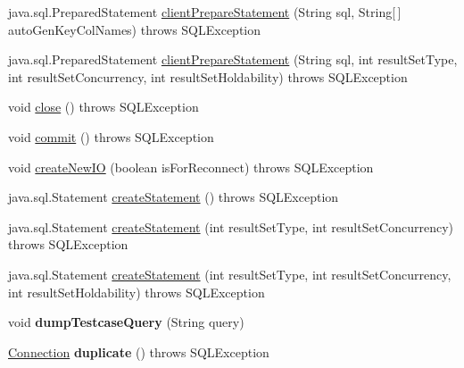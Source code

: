 \begin{DoxyCompactItemize}
\item 
java.\+sql.\+Prepared\+Statement \mbox{\hyperlink{classcom_1_1mysql_1_1jdbc_1_1_connection_impl_a9fcf3d739e8b60bdc9666e938ecd75ab}{client\+Prepare\+Statement}} (String sql, String\mbox{[}$\,$\mbox{]} auto\+Gen\+Key\+Col\+Names)  throws S\+Q\+L\+Exception 
\item 
java.\+sql.\+Prepared\+Statement \mbox{\hyperlink{classcom_1_1mysql_1_1jdbc_1_1_connection_impl_ab4f506b0ae8623a91e4aea7f33bb2da5}{client\+Prepare\+Statement}} (String sql, int result\+Set\+Type, int result\+Set\+Concurrency, int result\+Set\+Holdability)  throws S\+Q\+L\+Exception 
\item 
void \mbox{\hyperlink{classcom_1_1mysql_1_1jdbc_1_1_connection_impl_a9499cd266206c66001685b386c6a6b43}{close}} ()  throws S\+Q\+L\+Exception 
\item 
void \mbox{\hyperlink{classcom_1_1mysql_1_1jdbc_1_1_connection_impl_aa2c8c829d30458f22f7785396eb18af1}{commit}} ()  throws S\+Q\+L\+Exception 
\item 
void \mbox{\hyperlink{classcom_1_1mysql_1_1jdbc_1_1_connection_impl_ade9022e02eb0afed7976e6bc0f0b86da}{create\+New\+IO}} (boolean is\+For\+Reconnect)  throws S\+Q\+L\+Exception 
\item 
java.\+sql.\+Statement \mbox{\hyperlink{classcom_1_1mysql_1_1jdbc_1_1_connection_impl_af371aac6b857e26e7f92d486c52e3994}{create\+Statement}} ()  throws S\+Q\+L\+Exception 
\item 
java.\+sql.\+Statement \mbox{\hyperlink{classcom_1_1mysql_1_1jdbc_1_1_connection_impl_a17157765e71edeb5534901236da52fa3}{create\+Statement}} (int result\+Set\+Type, int result\+Set\+Concurrency)  throws S\+Q\+L\+Exception 
\item 
java.\+sql.\+Statement \mbox{\hyperlink{classcom_1_1mysql_1_1jdbc_1_1_connection_impl_abcace91f81040aecda4bb5b0528a4228}{create\+Statement}} (int result\+Set\+Type, int result\+Set\+Concurrency, int result\+Set\+Holdability)  throws S\+Q\+L\+Exception 
\item 
\mbox{\label{classcom_1_1mysql_1_1jdbc_1_1_connection_impl_a6922876feec89e4a92dd36c6344d3607}} 
void {\bfseries dump\+Testcase\+Query} (String query)
\item 
\mbox{\label{classcom_1_1mysql_1_1jdbc_1_1_connection_impl_a0f0cc1432b10af8f028788f139e3aeb4}} 
\mbox{\hyperlink{interfacecom_1_1mysql_1_1jdbc_1_1_connection}{Connection}} {\bfseries duplicate} ()  throws S\+Q\+L\+Exception 

\end{DoxyCompactItemize}
